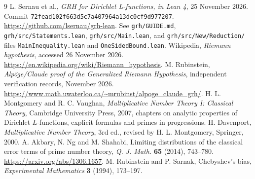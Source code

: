 \documentclass[11pt]{article}
\theoremstyle{remark}\newtheorem{remark}[theorem]{Remark}
\begin{document}
\begin{thebibliography}{9}
 L. Sernau et al., \emph{GRH for Dirichlet L-functions, in Lean 4}, 25 November 2026. Commit \texttt{72fead102f663d5c7a407964a13dc0cf9d977207}. \url{https://github.com/lsernau/grh-lean}. See \texttt{grh/GUIDE.md}, \texttt{grh/src/Statements.lean}, \texttt{grh/src/Main.lean}, and \texttt{grh/src/New/Reduction/} files \texttt{MainInequality.lean} and \texttt{OneSidedBound.lean}.
 Wikipedia, \emph{Riemann hypothesis}, accessed 26 November 2026. \url{https://en.wikipedia.org/wiki/Riemann_hypothesis}.
 M. Rubinstein, \emph{Alp\"oge/Claude proof of the Generalized Riemann Hypothesis}, independent verification records, November 2026. \url{https://www.math.uwaterloo.ca/~mrubinst/alpoge_claude_grh/}.
 H. L. Montgomery and R. C. Vaughan, \emph{Multiplicative Number Theory I: Classical Theory}, Cambridge University Press, 2007, chapters on analytic properties of Dirichlet $L$-functions, explicit formulas and primes in progressions.
 H. Davenport, \emph{Multiplicative Number Theory}, 3rd ed., revised by H. L. Montgomery, Springer, 2000.
 A. Akbary, N. Ng and M. Shahabi, Limiting distributions of the classical error terms of prime number theory, \emph{Q. J. Math.} \textbf{65} (2014), 743--780. \url{https://arxiv.org/abs/1306.1657}.
 M. Rubinstein and P. Sarnak, Chebyshev's bias, \emph{Experimental Mathematics} \textbf{3} (1994), 173--197.
\end{thebibliography}
\end{document}

